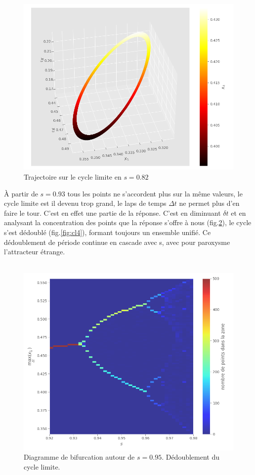 \documentclass{wsdcr}
\begin{document}
 \begin{figure}
    \centering
    \includegraphics[width=\linewidth]{fig/lv4_1cl4.png}
    \caption{Trajectoire sur le cycle limite en $s=0.82$}
    \label{fig:1cl4}
\end{figure}
À partir de $s=0.93$ tous les points ne s'accordent plus sur la même valeurs, le cycle limite est il devenu trop grand, le laps de temps $\Delta t$ ne permet plus d'en faire le tour. C'est en effet une partie de la réponse. C'est en diminuant $\delta t$ et en analysant la concentration des points que la réponse s'offre à nous (fig.\ref{fig:bifz}), le cycle s'est dédoublé (fig.\ref{fig:cl4}), formant toujours un ensemble unifié. Ce dédoublement de période continue en cascade avec s, avec pour paroxysme l'attracteur étrange.  \\ \\
\begin{figure}
    \centering
    \includegraphics[width=\linewidth]{fig/lv4_bifz.png}
    \caption{Diagramme de bifurcation autour de $s=0.95$. Dédoublement du cycle limite.}
    \label{fig:bifz}
\end{figure}
\end{document}
